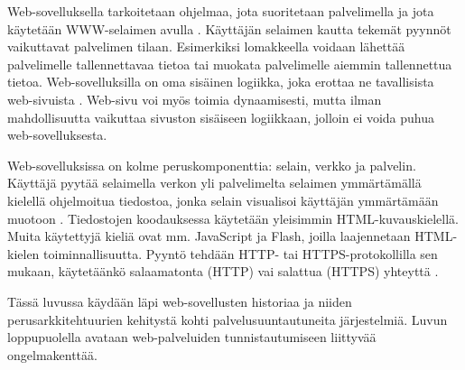 Web-sovelluksella tarkoitetaan ohjelmaa, jota suoritetaan palvelimella ja jota käytetään WWW-selaimen avulla \cite{uml}. Käyttäjän selaimen kautta tekemät pyynnöt vaikuttavat palvelimen tilaan. Esimerkiksi lomakkeella voidaan lähettää palvelimelle tallennettavaa tietoa tai muokata palvelimelle aiemmin tallennettua tietoa. Web-sovelluksilla on oma sisäinen logiikka, joka erottaa ne tavallisista web-sivuista \cite{uml}. Web-sivu voi myös toimia dynaamisesti, mutta ilman mahdollisuutta vaikuttaa sivuston sisäiseen logiikkaan, jolloin ei voida puhua web-sovelluksesta.

Web-sovelluksissa on kolme peruskomponenttia: selain, verkko ja palvelin. Käyttäjä pyytää selaimella verkon yli palvelimelta selaimen ymmärtämällä kielellä ohjelmoitua tiedostoa, jonka selain visualisoi käyttäjän ymmärtämään muotoon \cite{uml}. Tiedostojen koodauksessa käytetään yleisimmin HTML-kuvauskielellä. Muita käytettyjä kieliä ovat mm. JavaScript ja Flash, joilla laajennetaan HTML-kielen toiminnallisuutta. Pyyntö tehdään HTTP- tai HTTPS-protokollilla sen mukaan, käytetäänkö salaamatonta (HTTP) vai salattua (HTTPS) yhteyttä \cite{rfc2818}.

Tässä luvussa käydään läpi web-sovellusten historiaa ja niiden perusarkkitehtuurien kehitystä kohti palvelusuuntautuneita järjestelmiä. Luvun loppupuolella avataan web-palveluiden tunnistautumiseen liittyvää ongelmakenttää.